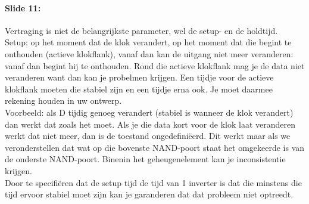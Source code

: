 \documentclass[10pt,a4paper]{book}
\begin{document}
\paragraph{Slide 11:} Vertraging is niet de belangrijkste parameter, wel de setup- en de holdtijd.\\
Setup: op het moment dat de klok verandert, op het moment dat die begint te onthouden (actieve klokflank), vanaf dan kan de uitgang niet meer veranderen: vanaf dan begint hij te onthouden. Rond die actieve klokflank mag je de data niet veranderen want dan kan je probelmen krijgen. Een tijdje voor de actieve klokflank moeten die stabiel zijn en een tijdje erna ook. Je moet daarmee rekening houden in uw ontwerp.\\
Voorbeeld: als D tijdig genoeg verandert (stabiel is wanneer de klok verandert) dan werkt dat zoals het moet. Als je die data kort voor de klok laat veranderen werkt dat niet meer, dan is de toestand ongedefini\"eerd. Dit werkt maar als we veronderstellen dat wat op die bovenste NAND-poort staat het omgekeerde is van de onderste NAND-poort.  Binenin het geheugenelement kan je inconsistentie krijgen.\\
Door te specifi\"eren dat de setup tijd de tijd van 1 inverter is dat die minstens die tijd ervoor stabiel moet zijn kan je garanderen dat dat probleem niet optreedt.
\end{document}
